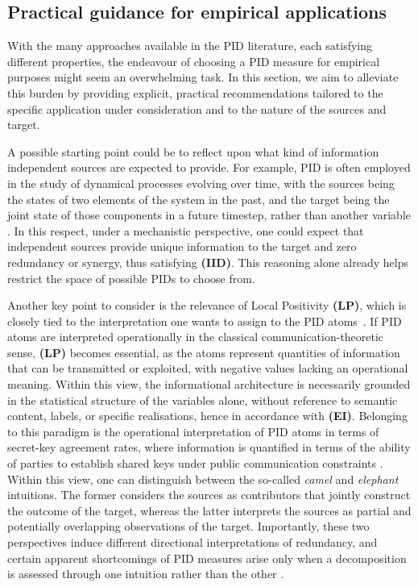 \documentclass{article}
\newcommand{\IID}{\textbf{(IID)}\xspace} %
\newcommand{\EI}{\textbf{(EI)}\xspace} %
\newcommand{\LP}{\textbf{(LP)}\xspace}
\begin{document}
\subsection{Practical guidance for empirical applications}

With the many approaches available in the PID literature, each satisfying different properties, the endeavour of choosing a PID measure for empirical purposes might seem an overwhelming task. In this section, we aim to alleviate this burden by providing explicit, practical recommendations tailored to the specific application under consideration and to the nature of the sources and target. 

A possible starting point could be to reflect upon what kind of information independent sources are expected to provide. 
For example, PID is often employed in the study of dynamical processes evolving over time, with the sources being the states of two elements of the system in the past, and the target being the joint state of those components in a future timestep, rather than another variable \cite{faes2025predictive, liardi2025null}. In this respect, under a mechanistic perspective, one could expect that independent sources provide unique information to the target and zero redundancy or synergy, thus satisfying \IID. This reasoning alone already helps restrict the space of possible PIDs to choose from. 

Another key point to consider is the relevance of Local Positivity \LP, which is closely tied to the interpretation one wants to assign to the PID atoms~\cite{chicharro2018identity}. If PID atoms are interpreted operationally in the classical communication-theoretic sense, \LP becomes essential, as the atoms represent quantities of information that can be transmitted or exploited, with negative values lacking an operational meaning. Within this view, the informational architecture is necessarily grounded in the statistical structure of the variables alone, without reference to semantic content, labels, or specific realisations, hence in accordance with \EI. 
Belonging to this paradigm is the operational interpretation of PID atoms in terms of secret-key agreement rates, where information is quantified in terms of the ability of parties to establish shared keys under public communication constraints \cite{james2018uniquekey}. Within this view, one can distinguish between the so-called \textit{camel} and \textit{elephant} intuitions. The former considers the sources as contributors that jointly construct the outcome of the target, whereas the latter interprets the sources as partial and potentially overlapping observations of the target. Importantly, these two perspectives induce different directional interpretations of redundancy, and certain apparent shortcomings of PID measures arise only when a decomposition is assessed through one intuition rather than the other \cite{james2018uniquekey, banerjee2018unique}.
\end{document}
